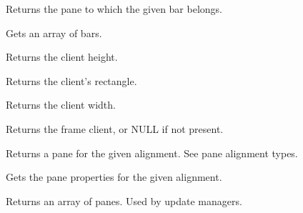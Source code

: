 \label{wxframelayoutgetbarpane}


Returns the pane to which the given bar belongs.


\label{wxframelayoutgetbars}


Gets an array of bars.


\label{wxframelayoutgetclientheight}


Returns the client height.


\label{wxframelayoutgetclientrect}


Returns the client's rectangle.


\label{wxframelayoutgetclientwidth}


Returns the client width.


\label{wxframelayoutgetframeclient}


Returns the frame client, or NULL if not present.


\label{wxframelayoutgetpane}


Returns a pane for the given alignment. See pane alignment types.


\label{wxframelayoutgetpaneproperties}


Gets the pane properties for the given alignment.


\label{wxframelayoutgetpanesarray}


Returns an array of panes. Used by update managers.


